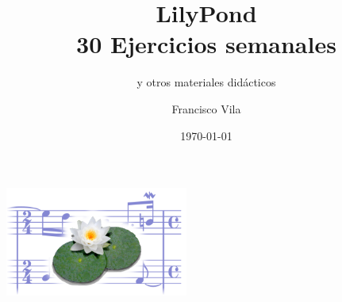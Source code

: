 \documentclass[10pt,a4paper,oneside,headinclude,titlepage]{scrartcl} %
\title{LilyPond\\30 Ejercicios semanales}
\subtitle{y otros materiales didácticos}
\author{Francisco Vila}
\date{\today}
\begin{document}
\nonfrenchspacing

\begin{titlepage} %
  \makeatletter
  \begin{center}
    \vfill
    \includegraphics[width=60mm]{lily-logo.png}\par
    \vfill
    \textbf{\huge\@title}\par
    \textbf{\large\@subtitle}\par
    {\@date}
    \vfill
    \textbf{\large\@author}
    \vfill
  \end{center}
  \makeatother
\end{titlepage}


\begin{singlespace} %
  \tableofcontents
\end{singlespace}
 
 
 
 
 
 
 
 
 
 
 
 
 
 
 
 
 
 
 
 
 
 
 
 
 
 
 
 
 
 
 
 
 \appendix
 
 
 
\end{document}
